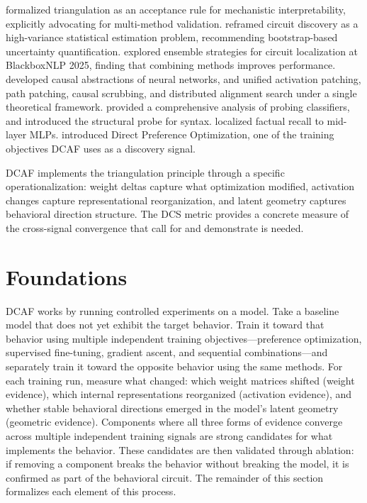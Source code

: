 \documentclass[11pt]{article}
\begin{document}
\citet{long2025triangulation} formalized triangulation as an acceptance rule for mechanistic interpretability, explicitly advocating for multi-method validation. \citet{meloux2025variance} reframed circuit discovery as a high-variance statistical estimation problem, recommending bootstrap-based uncertainty quantification. \citet{mondorf2025ensemble} explored ensemble strategies for circuit localization at BlackboxNLP 2025, finding that combining methods improves performance. \citet{geiger2021causal} developed causal abstractions of neural networks, and \citet{geiger2025causal} unified activation patching, path patching, causal scrubbing, and distributed alignment search under a single theoretical framework. \citet{belinkov2022probing} provided a comprehensive analysis of probing classifiers, and \citet{hewitt2019structural} introduced the structural probe for syntax. \citet{meng2022rome} localized factual recall to mid-layer MLPs. \citet{rafailov2023dpo} introduced Direct Preference Optimization, one of the training objectives DCAF uses as a discovery signal.

DCAF implements the triangulation principle through a specific operationalization: weight deltas capture what optimization modified, activation changes capture representational reorganization, and latent geometry captures behavioral direction structure. The DCS metric provides a concrete measure of the cross-signal convergence that \citet{sharkey2025openproblems} call for and \citet{meloux2025variance} demonstrate is needed.

\newpage

\section{Foundations}
\label{sec:foundations}

DCAF works by running controlled experiments on a model. Take a baseline model that does not yet exhibit the target behavior. Train it toward that behavior using multiple independent training objectives---preference optimization, supervised fine-tuning, gradient ascent, and sequential combinations---and separately train it toward the opposite behavior using the same methods. For each training run, measure what changed: which weight matrices shifted (weight evidence), which internal representations reorganized (activation evidence), and whether stable behavioral directions emerged in the model's latent geometry (geometric evidence). Components where all three forms of evidence converge across multiple independent training signals are strong candidates for what implements the behavior. These candidates are then validated through ablation: if removing a component breaks the behavior without breaking the model, it is confirmed as part of the behavioral circuit. The remainder of this section formalizes each element of this process.
\end{document}
